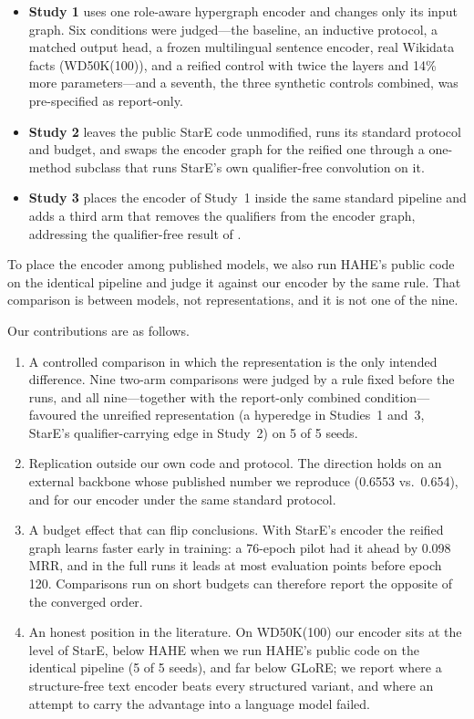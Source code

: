 \documentclass[11pt,a4paper]{article}
\begin{document}
\begin{itemize}
\item \textbf{Study 1} uses one role-aware hypergraph encoder and changes only its input graph. Six conditions were judged---the baseline, an inductive protocol, a matched output head, a frozen multilingual sentence encoder, real Wikidata facts (WD50K(100)), and a reified control with twice the layers and 14\% more parameters---and a seventh, the three synthetic controls combined, was pre-specified as report-only.
\item \textbf{Study 2} leaves the public StarE code \citep{galkin2020stare} unmodified, runs its standard protocol and budget, and swaps the encoder graph for the reified one through a one-method subclass that runs StarE's own qualifier-free convolution on it.
\item \textbf{Study 3} places the encoder of Study~1 inside the same standard pipeline and adds a third arm that removes the qualifiers from the encoder graph, addressing the qualifier-free result of \citet{wang2025understanding}.
\end{itemize}

To place the encoder among published models, we also run HAHE's public code \citep{luo2023hahe} on the identical pipeline and judge it against our encoder by the same rule. That comparison is between models, not representations, and it is not one of the nine.

Our contributions are as follows.
\begin{enumerate}
\item A controlled comparison in which the representation is the only intended difference. Nine two-arm comparisons were judged by a rule fixed before the runs, and all nine---together with the report-only combined condition---favoured the unreified representation (a hyperedge in Studies~1 and~3, StarE's qualifier-carrying edge in Study~2) on 5 of 5 seeds.
\item Replication outside our own code and protocol. The direction holds on an external backbone whose published number we reproduce (0.6553 vs.\ 0.654), and for our encoder under the same standard protocol.
\item A budget effect that can flip conclusions. With StarE's encoder the reified graph learns faster early in training: a 76-epoch pilot had it ahead by 0.098 MRR, and in the full runs it leads at most evaluation points before epoch 120. Comparisons run on short budgets can therefore report the opposite of the converged order.
\item An honest position in the literature. On WD50K(100) our encoder sits at the level of StarE, below HAHE when we run HAHE's public code on the identical pipeline (5 of 5 seeds), and far below GLoRE; we report where a structure-free text encoder beats every structured variant, and where an attempt to carry the advantage into a language model failed.
\end{enumerate}
\end{document}
